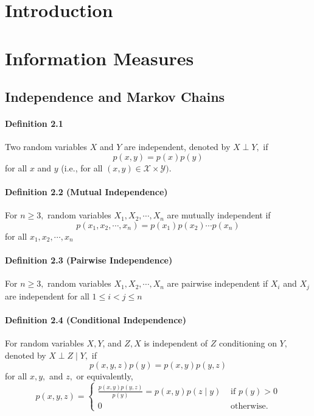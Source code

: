 \documentclass[8pt]{article}
\begin{document}
\section{Introduction}
\section{Information Measures}
\subsection{Independence and Markov Chains}
\paragraph{Definition 2.1} Two random variables $X$ and $Y$ are independent, denoted by $X \perp Y,$ if
$$
p(x, y)=p(x) p(y)
$$
for all $x$ and $y$ (i.e., for all $(x, y) \in \mathcal{X} \times \mathcal{Y})$.

\paragraph{Definition 2.2 (Mutual Independence)} For $n \geq 3,$ random variables $X_{1}, X_{2}, \cdots, X_{n}$ are mutually independent if
$$
p\left(x_{1}, x_{2}, \cdots, x_{n}\right)=p\left(x_{1}\right) p\left(x_{2}\right) \cdots p\left(x_{n}\right)
$$
for all $x_{1}, x_{2}, \cdots, x_{n}$

\paragraph{Definition 2.3 (Pairwise Independence)} For $n \geq 3,$ random variables $X_{1}, X_{2}, \cdots, X_{n}$ are pairwise independent if $X_{i}$ and $X_{j}$ are independent for all $1 \leq i<j \leq n$

\paragraph{Definition 2.4 (Conditional Independence)} For random variables $X, Y$, and $Z, X$ is independent of $Z$ conditioning on $Y,$ denoted by $X \perp Z \mid Y,$ if
$$
p(x, y, z) p(y)=p(x, y) p(y, z)
$$
for all $x, y,$ and $z,$ or equivalently,
$$
p(x, y, z)=\left\{\begin{array}{ll}
\frac{p(x, y) p(y, z)}{p(y)}=p(x, y) p(z \mid y) & \text { if } p(y)>0 \\
0 & \text { otherwise. }
\end{array}\right.
$$
\end{document}
